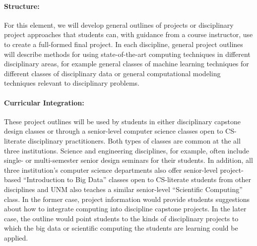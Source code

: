 \paragraph{Structure:} For this element, we will develop general outlines of projects or disciplinary project approaches that students can, with guidance from a course instructor, use to create a full-formed final project. In each discipline, general project outlines will describe methods for using state-of-the-art computing techniques in different disciplinary areas, for example general classes of machine learning techniques for different classes of disciplinary data or general computational modeling techniques relevant to disciplinary problems.

\paragraph{Curricular Integration:}
These project outlines will be used by students in either disciplinary capstone design classes or through a senior-level computer science classes open to CS-literate disciplinary practitioners. Both types of classes are common at the all three institutions. Science and engineering disciplines, for example, often include single- or multi-semester senior design seminars for their students. In addition, all three institution's computer science departments also offer senior-level project-based ``Introduction to Big Data'' classes open to CS-literate students from other disciplines and UNM also teaches a similar senior-level ``Scientific Computing'' class. In the former case, project information would provide students suggestions about how to integrate computing into discipline capstone projects. In the later case, the outline would point students to the kinds of disciplinary projects to which the big data or scientific computing the students are learning could be applied.




